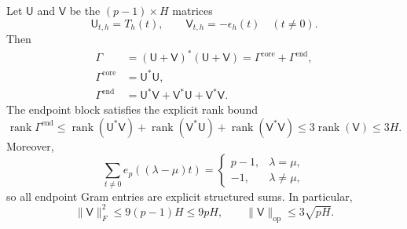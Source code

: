 Let $\mathsf U$ and $\mathsf V$ be the $(p-1)\times H$ matrices
\[
 \mathsf U_{t,h}=T_h(t),\qquad
 \mathsf V_{t,h}=-\epsilon_h(t)
 \quad(t\ne0).
\]
Then
\begin{align}
 \Gamma
 &=(\mathsf U+\mathsf V)^*(\mathsf U+\mathsf V)
 =\Gamma^{\mathrm{core}}+\Gamma^{\mathrm{end}},
 \label{gram-core-end-split}\\
 \Gamma^{\mathrm{core}}
 &=\mathsf U^*\mathsf U,
 \label{gram-core-def}\\
 \Gamma^{\mathrm{end}}
 &=\mathsf U^*\mathsf V+\mathsf V^*\mathsf U
   +\mathsf V^*\mathsf V.
 \label{gram-end-def}
\end{align}
The endpoint block satisfies the explicit rank bound
\begin{equation}
 \operatorname{rank}\Gamma^{\mathrm{end}}
 \le \operatorname{rank}(\mathsf U^*\mathsf V)
   +\operatorname{rank}(\mathsf V^*\mathsf U)
   +\operatorname{rank}(\mathsf V^*\mathsf V)
 \le3\operatorname{rank}(\mathsf V)
 \le3H.
 \label{gram-endpoint-rank}
\end{equation}
Moreover,
\begin{equation}
 \sum_{t\ne0}e_p((\lambda-\mu)t)
 =\begin{cases}
 p-1,&\lambda=\mu,\\
 -1,&\lambda\ne\mu,
 \end{cases}
 \label{gram-endpoint-inner-product}
\end{equation}
so all endpoint Gram entries are explicit structured sums.  In
particular,
\begin{equation}
 \|\mathsf V\|_F^2\le9(p-1)H\le9pH,
 \qquad
 \|\mathsf V\|_{\mathrm{op}}\le3\sqrt{pH}.
 \label{gram-endpoint-norm}
\end{equation}

